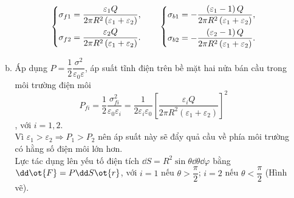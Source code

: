 \begin{loigiai}
\begin{enumerate}[1)]
\begin{enumerate}[a)]
            \[\left\{ \begin{gathered}
          {\sigma _{f1}} = \dfrac{{{\varepsilon _1}Q}}{{2\pi {R^2}\left( {{\varepsilon _1} + {\varepsilon _2}} \right)}}, \hfill \\
          {\sigma _{f2}} = \dfrac{{{\varepsilon _2}Q}}{{2\pi {R^2}\left( {{\varepsilon _1} + {\varepsilon _2}} \right)}} .\hfill \\ 
        \end{gathered}  \right.~~~~~~\left\{ \begin{gathered}
          {\sigma _{b1}} =  - \dfrac{{\left( {{\varepsilon _1} - 1} \right)Q}}{{2\pi {R^2}\left( {{\varepsilon _1} + {\varepsilon _2}} \right)}}, \hfill \\
          {\sigma _{b2}} =  - \dfrac{{\left( {{\varepsilon _2} - 1} \right)Q}}{{2\pi {R^2}\left( {{\varepsilon _1} + {\varepsilon _2}} \right)}}. \hfill \\ 
        \end{gathered}  \right.\]
        \item Áp dụng $P=\dfrac{1}{2}\dfrac{{{\sigma }^{2}}}{{{\varepsilon }_{0}}\varepsilon }$, áp suất tĩnh điện trên bề mặt hai nửa bán cầu trong môi trường điện môi  $${{P}_{fi}}=\dfrac{1}{2}\dfrac{\sigma _{fi}^{2}}{{{\varepsilon }_{0}}{{\varepsilon }_{i}}}=\dfrac{1}{2{{\varepsilon }_{i}}{{\varepsilon }_{0}}}{{\left[ \dfrac{{{\varepsilon }_{i}}Q}{2\pi {{R}^{2}}\left( {{\varepsilon }_{1}}+{{\varepsilon }_{2}} \right)} \right]}^{2}}$$, với $i=1,2$. 
        \\Vì ${{\varepsilon }_{1}}>{{\varepsilon }_{2}}\Rightarrow {{P}_{1}}>{{P}_{2}}$ nên áp suất này sẽ đẩy quả cầu về phía môi trường có hằng số điện môi lớn hơn.
        \\Lực tác dụng lên yếu tố điện tích $\dd S={{R}^{2}}\sin \theta \dd\theta \dd\varphi $ bằng $\dd\ot{F}=P\dd S\ot{r}$, với $i=1$ nếu $\theta >\dfrac{\pi }{2}$;  $i=2$ nếu $\theta <\dfrac{\pi }{2}$ (Hình vẽ).
        \begin{center}
\end{center}
\end{enumerate}
\end{enumerate}
\end{loigiai}
